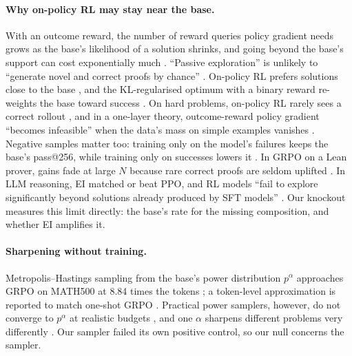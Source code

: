 \paragraph{Why on-policy RL may stay near the base.} With an outcome reward, the number of reward queries policy gradient needs
grows as the base's likelihood of a solution shrinks, and going beyond the base's support can cost exponentially
much \citep{mousavihosseini2026barrier}. ``Passive exploration'' is unlikely to ``generate novel and
correct proofs by chance'' \citep{xie2024xpo}. On-policy RL prefers solutions close to the base \citep{shenfeld2025rlrazor},
and the KL-regularised optimum with a binary reward re-weights the base toward success
\citep{korbak2022rlkl}. On hard problems, on-policy RL rarely sees a correct rollout \citep{qu2026pope}, and in a one-layer theory,
outcome-reward policy gradient ``becomes infeasible'' when the data's mass on simple examples vanishes
\citep{ranmilo2026outcomerl}. Negative samples matter too: training only on the model's failures keeps the base's
pass@256, while training only on successes lowers it \citep{zhu2025nsr}. In GRPO on a
Lean prover, gains fade at large $N$ because rare correct proofs are seldom uplifted \citep{he2025unlikely}. In LLM
reasoning, EI matched or beat PPO, and RL models ``fail to explore significantly beyond solutions already produced by
SFT models'' \citep{havrilla2024teaching}. Our knockout measures this limit directly: the base's rate for the missing
composition, and whether EI amplifies it.

\paragraph{Sharpening without training.} Metropolis--Hastings sampling from the base's power distribution $p^\alpha$
approaches GRPO on MATH500 at 8.84 times the tokens \citep{karan2025power}; a token-level approximation is reported to
match one-shot GRPO \citep{ji2026scalablepower}. Practical power samplers, however, do not converge to $p^\alpha$ at
realistic budgets \citep{talwar2026power}, and one $\alpha$ sharpens different problems very differently
\citep{yang2026correctmass}. Our sampler failed its own positive control, so our null concerns the sampler.

